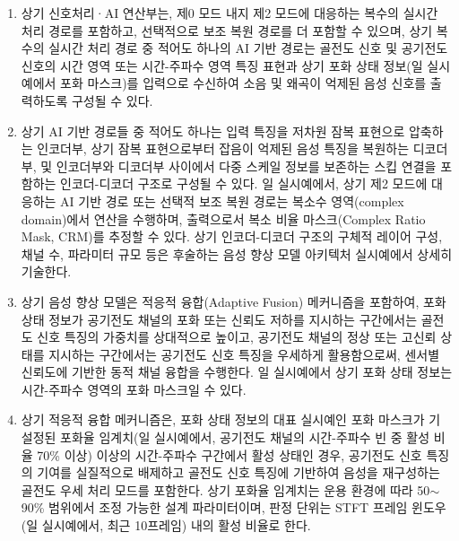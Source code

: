 \documentclass{article}
\DeclareRobustCommand{\codexedit}[1]{\textcolor{customorange}{#1}}
\DeclareRobustCommand{\vtwoedit}[1]{\textcolor{customgreen}{#1}}
\begin{document}
\begin{enumerate}[label = \textbf{(B.2.\arabic*)}]

    \item \codexedit{상기 신호처리·AI 연산부는, 제0 모드 내지 제2 모드에 대응하는 복수의 실시간 처리 경로를 포함하고, 선택적으로 보조 복원 경로를 더 포함할 수 있으며, 상기 복수의 실시간 처리 경로 중 적어도 하나의 AI 기반 경로는 골전도 신호 및 공기전도 신호의 시간 영역 또는 시간-주파수 영역 특징 표현과 \vtwoedit{상기 포화 상태 정보(일 실시예에서 포화 마스크)}를 입력으로 수신하여 소음 및 왜곡이 억제된 음성 신호를 출력하도록 구성될 수 있다.}

    \item \codexedit{상기 AI 기반 경로들 중 적어도 하나는 입력 특징을 저차원 잠복 표현으로
    압축하는 인코더부, 상기 잠복 표현으로부터 잡음이 억제된 음성 특징을
    복원하는 디코더부, 및 인코더부와 디코더부 사이에서 다중 스케일
    정보를 보존하는 스킵 연결을 포함하는 인코더-디코더 구조로 구성될 수 있다. 일 실시예에서, 상기 제2 모드에 대응하는 AI 기반 경로 또는 선택적 보조 복원 경로는 복소수 영역(complex domain)에서 연산을 수행하며, 출력으로서 복소 비율 마스크(Complex Ratio Mask, CRM)를 추정할 수 있다. 상기 인코더-디코더 구조의 구체적 레이어 구성, 채널 수, 파라미터 규모 등은 후술하는 음성 향상 모델 아키텍처 실시예에서 상세히 기술한다.}

    \item \vtwoedit{상기 음성 향상 모델은 적응적 융합(Adaptive Fusion) 메커니즘을 포함하여, 포화 상태 정보가 공기전도 채널의 포화 또는 신뢰도 저하를 지시하는 구간에서는 골전도 신호 특징의 가중치를 상대적으로 높이고, 공기전도 채널의 정상 또는 고신뢰 상태를 지시하는 구간에서는 공기전도 신호 특징을 우세하게 활용함으로써, 센서별 신뢰도에 기반한 동적 채널 융합을 수행한다. 일 실시예에서 상기 포화 상태 정보는 시간-주파수 영역의 포화 마스크일 수 있다.}

    \item \vtwoedit{상기 적응적 융합 메커니즘은, 포화 상태 정보의 대표 실시예인 포화 마스크가 }
    기 설정된 포화율 임계치(일 실시예에서, 공기전도 채널의 시간-주파수 빈 중 활성 비율 70\% 이상) 이상의 시간-주파수 구간에서 활성 상태인 
    경우, 공기전도 신호 특징의 기여를 실질적으로 
    배제하고 골전도 신호 특징에 기반하여 음성을 
    재구성하는 골전도 우세 처리 모드를 포함한다. 상기 포화율 임계치는 운용 환경에 따라 50$\sim$90\% 범위에서 조정 가능한 설계 파라미터이며, 판정 단위는 STFT 프레임 윈도우(일 실시예에서, 최근 10프레임) 내의 활성 비율로 한다.


\end{enumerate}
\end{document}
